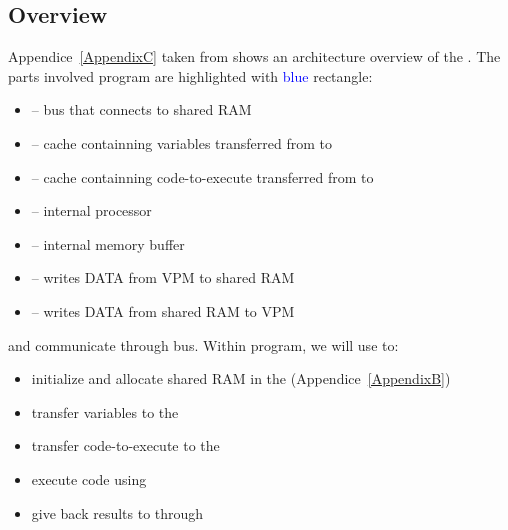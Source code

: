 \subsection{\vc{} Overview}

Appendice~\ref{AppendixC} taken from \parencite{refVC} shows an architecture overview of the \vc. The  parts involved  program are highlighted with \textcolor{blue}{blue} rectangle:



\begin{itemize}
	\item {} -- bus that connects \vc{} to shared RAM
	\item {} -- cache containning variables transferred from \cpu{} to \vc
	\item {} -- cache containning code-to-execute transferred from \cpu{} to \vc
	\item {} -- \vc{} internal processor
	\item {} -- \vc{} internal memory buffer
	\item {} -- writes DATA from VPM to shared RAM
	\item {} -- writes DATA from shared RAM to VPM
\end{itemize}
\vspace{5 mm}

\cpu{} and \vc{} communicate through  bus. Within  program, we will use \cpu{} to:
\begin{itemize}
	\item initialize and allocate shared RAM in the  (Appendice~\ref{AppendixB})
	\item transfer variables to the 
	\item transfer code-to-execute to the 
	\item execute code using 
	\item give back results to \cpu{} through 
\end{itemize}


